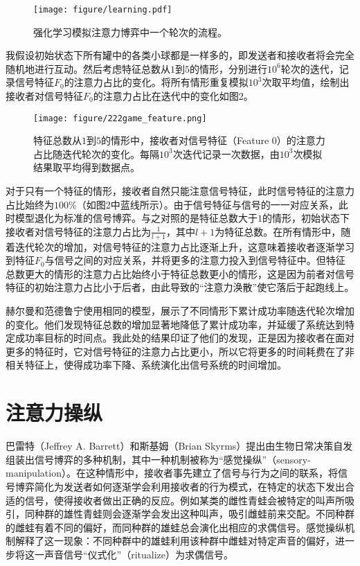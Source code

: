 \documentclass[12pt]{ctexart}  %
\begin{document}
\begin{figure}[htbp]
    \centering
    \texttt{[image: figure/learning.pdf]}
    \caption{强化学习模拟注意力博弈中一个轮次的流程。}
\end{figure}

我假设初始状态下所有罐中的各类小球都是一样多的，即发送者和接收者将会完全随机地进行互动。然后考虑特征总数从$1$到$5$的情形，分别进行$10^6$轮次的迭代，记录信号特征$F_0$的注意力占比的变化。将所有情形重复模拟$10^3$次取平均值，绘制出接收者对信号特征$F_0$的注意力占比在迭代中的变化如图2。

\begin{figure}[htbp] 
    \label{attention_feature}
  \centering
  \texttt{[image: figure/222game\_feature.png]}  
  \caption{特征总数从$1$到$5$的情形中，接收者对信号特征（Feature 0）的注意力占比随迭代轮次的变化。每隔$10^3$次迭代记录一次数据，由$10^3$次模拟结果取平均得到数据点。}
\end{figure}

对于只有一个特征的情形，接收者自然只能注意信号特征，此时信号特征的注意力占比始终为$100\%$（如图2中蓝线所示）。由于信号特征与信号的一一对应关系，此时模型退化为标准的信号博弈。与之对照的是特征总数大于$1$的情形，初始状态下接收者对信号特征的注意力占比为$\frac{1}{l+1}$，其中$l+1$为特征总数。在所有情形中，随着迭代轮次的增加，对信号特征的注意力占比逐渐上升，这意味着接收者逐渐学习到特征$F_0$与信号之间的对应关系，并将更多的注意力投入到信号特征中。但特征总数更大的情形的注意力占比始终小于特征总数更小的情形，这是因为前者对信号特征的初始注意力占比小于后者，由此导致的“注意力涣散”使它落后于起跑线上。

赫尔曼和范德鲁宁使用相同的模型，展示了不同情形下累计成功率随迭代轮次增加的变化。\cite{attention}他们发现特征总数的增加显著地降低了累计成功率，并延缓了系统达到特定成功率目标的时间点。我此处的结果印证了他们的发现，正是因为接收者在面对更多的特征时，它对信号特征的注意力占比更小，所以它将更多的时间耗费在了非相关特征上，使得成功率下降、系统演化出信号系统的时间增加。

\section{注意力操纵}
巴雷特（Jeffrey A. Barrett）和斯基姆（Brian Skyrms）提出由生物日常决策自发组装出信号博弈的多种机制，其中一种机制被称为“感觉操纵”（sensory-manipulation）。\cite{Assemblying}在这种情形中，接收者事先建立了信号与行为之间的联系，将信号博弈简化为发送者如何逐渐学会利用接收者的行为模式，在特定的状态下发出合适的信号，使得接收者做出正确的反应。例如某类的雌性青蛙会被特定的叫声所吸引，同种群的雄性青蛙则会逐渐学会发出这种叫声，吸引雌蛙前来交配。不同种群的雌蛙有着不同的偏好，而同种群的雄蛙总会演化出相应的求偶信号。\cite{frog}感觉操纵机制解释了这一现象：不同种群中的雄蛙利用该种群中雌蛙对特定声音的偏好，进一步将这一声音信号“仪式化”（ritualize）为求偶信号。
\end{document}
